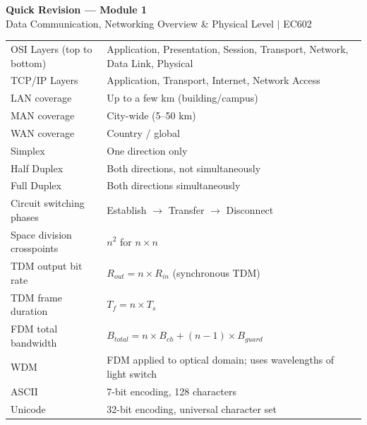 \documentclass[12pt,a4paper]{article}
\begin{document}
\newpage
\begin{center}
  {\large\bfseries\color{myred} Quick Revision --- Module 1}\\[3pt]
  {\small\color{mydark} Data Communication, Networking Overview \& Physical Level $|$ EC602}
\end{center}
\noindent{\color{myred}\rule{\linewidth}{1.2pt}}
\vspace{4pt}

\begin{tcolorbox}[formulabox, title={\textbf{Key Facts at a Glance}}]
\begin{tabularx}{\linewidth}{B{4.8cm} X}
OSI Layers (top to bottom) & Application, Presentation, Session, Transport, Network, Data Link, Physical \\[2pt]
TCP/IP Layers              & Application, Transport, Internet, Network Access \\[2pt]
LAN coverage               & Up to a few km (building/campus) \\[2pt]
MAN coverage               & City-wide (5--50 km) \\[2pt]
WAN coverage               & Country / global \\[2pt]
Simplex                    & One direction only \\[2pt]
Half Duplex                & Both directions, not simultaneously \\[2pt]
Full Duplex                & Both directions simultaneously \\[2pt]
Circuit switching phases   & Establish $\to$ Transfer $\to$ Disconnect \\[2pt]
Space division crosspoints & $n^2$ for $n \times n$ \\[2pt]
TDM output bit rate        & $R_{out} = n \times R_{in}$ (synchronous TDM) \\[2pt]
TDM frame duration         & $T_f = n \times T_s$ \\[2pt]
FDM total bandwidth        & $B_{total} = n \times B_{ch} + (n-1) \times B_{guard}$ \\[2pt]
WDM                        & FDM applied to optical domain; uses wavelengths of light switch \\[2pt]
ASCII                      & 7-bit encoding, 128 characters \\[2pt]
Unicode                    & 32-bit encoding, universal character set \\[2pt]
\end{tabularx}
\end{tcolorbox}
\end{document}
